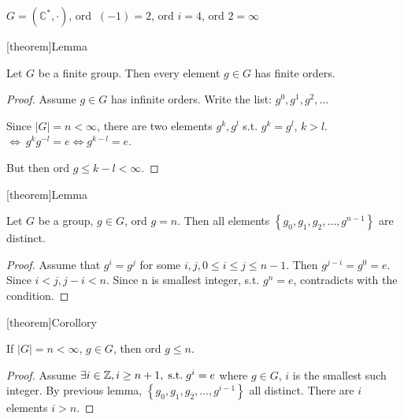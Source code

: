 \documentclass[12pt]{report}
\theoremstyle{definition}
\begin{document}
\begin{ex}
    $G = (\mathbb{C}^{*}, \cdot)$, ord $\ (-1) = 2$, ord $i = 4$, ord $2 = \infty$
\end{ex}

[theorem]{Lemma}
\begin{finite cyclic group}
    Let $G$ be a finite group. Then every element $g \in G$ has finite orders.%
\end{finite cyclic group}

\begin{proof}
    Assume $g \in G$ has infinite orders. %
    Write the list: $g^{0}, g^{1}, g^{2}, \ldots$

    Since $|G| = n < \infty$, there are two elements 
    $g^{k}, g^{l}$ s.t. $g^{k} = g^{l}$, $k > l$.
    $\iff\ g^{k} g^{-l} = e \iff g^{k - l} = e$.%

    But then ord $g \le k - l < \infty$.%
\end{proof}

[theorem]{Lemma}
\begin{distinct element in a group}
    Let $G$ be a group, $g \in G$, ord $g = n$. %
    Then all elements $\left\{g_0, g_1, g_2, \ldots, g^{n-1}\right\} $ are distinct.
\end{distinct element in a group}

\begin{proof}
    Assume that $g^{i} = g^{j}$ for some $i, j, 0 \le i \le j \le n - 1$. %
    Then $g^{j-i} = g^0 = e$. Since $i < j, {j-i} < n$. Since n is smallest integer, s.t. $g^{n} = e$,
    contradicts with the condition.
\end{proof}

[theorem]{Corollory}
\begin{ord g <= n}
    If $|G| = n < \infty$, $g \in G$, then ord $g \le n$. %
\end{ord g <= n}

\begin{proof}
    Assume $\exists{}i \in{}\mathbb{Z}, i \ge{}n + 1, \;\textnormal{s.t.}\; g^{i} = e $
    where $g \in{}G$, $i$ is the smallest such integer.
    By previous lemma, $\left\{g_0, g_1, g_2, \ldots, g^{i-1}\right\} $ all distinct.
    There are $i$ elements $i > n$.
\end{proof}
\end{document}
